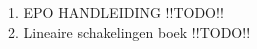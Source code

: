 \documentclass{article}
\begin{document}
1. EPO HANDLEIDING !!TODO!!
\\
2. Lineaire schakelingen boek !!TODO!!
\end{document}

